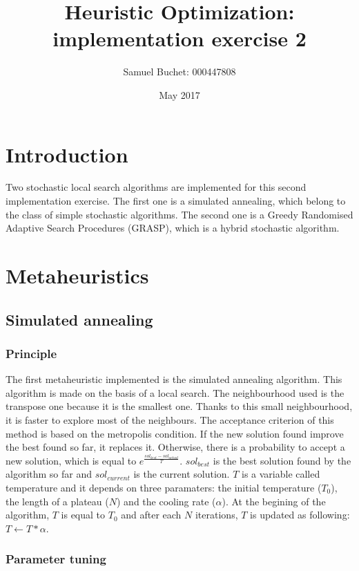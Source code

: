 \documentclass{article}
\title{Heuristic Optimization: implementation exercise 2}
\author{Samuel Buchet: 000447808}
\date{May 2017}
\begin{document}
\maketitle

\section{Introduction}

Two stochastic local search algorithms are implemented for this second implementation exercise.
The first one is a simulated annealing, which belong to the class of simple stochastic algorithms.
The second one is a Greedy Randomised Adaptive Search Procedures (GRASP), which is a hybrid stochastic algorithm.

\section{Metaheuristics}

\subsection{Simulated annealing}

\subsubsection{Principle}

The first metaheuristic implemented is the simulated annealing algorithm.
This algorithm is made on the basis of a local search.
The neighbourhood used is the transpose one because it is the smallest one.
Thanks to this small neighbourhood, it is faster to explore most of the neighbours.
The acceptance criterion of this method is based on the metropolis condition.
If the new solution found improve the best found so far, it replaces it. Otherwise, there is a probability to accept a new solution, which is equal to $e^{ \frac{sol_{best}-sol_{actual}}{T}}$.
$sol_{best}$ is the best solution found by the algorithm so far and $sol_{current}$ is the current solution.
$T$ is a variable called temperature and it depends on three paramaters: the initial temperature ($T_0$), the length of a plateau ($N$) and the cooling rate ($\alpha$).
At the begining of the algorithm, $T$ is equal to $T_0$ and after each $N$ iterations, $T$ is updated as following: $T \leftarrow T*\alpha$.

\subsubsection{Parameter tuning}
\end{document}
